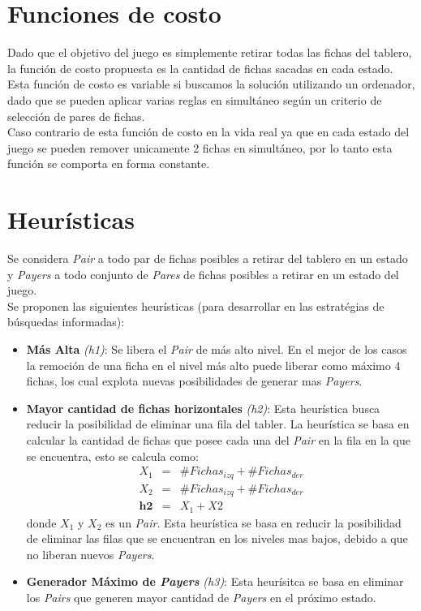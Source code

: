 \documentclass{sig-alternate}
\begin{document}
\section*{Funciones de costo}

	Dado que el objetivo del juego es simplemente retirar todas las fichas del tablero, la funci\'on de costo propuesta es la cantidad de fichas sacadas en cada estado. \\
	Esta funci\'on de costo es variable si buscamos la soluci\'on utilizando un ordenador, dado que se pueden aplicar varias reglas en simult\'aneo seg\'un un criterio de selecci\'on de pares de fichas. \\
	Caso contrario de esta funci\'on de costo en la vida real ya que en cada estado del juego se pueden remover unicamente 2 fichas en simult\'aneo, por lo tanto esta funci\'on se comporta en forma constante.

\section*{Heur\'isticas}

	Se considera \textit{Pair} a todo par de fichas posibles a retirar del tablero en un estado y \textit{Payers} a todo conjunto de \textit{Pares} de fichas posibles a retirar en un estado del juego. \\
	Se proponen las siguientes heur\'isticas (para desarrollar en las estrat\'egias de b\'usquedas informadas):
	\begin{itemize}

		\item \textbf{M\'as Alta} \textit{(h1)}: Se libera el \textit{Pair} de m\'as alto nivel. En el mejor de los casos la remoci\'on de una ficha en el nivel m\'as alto puede liberar como m\'aximo 4 fichas, los cual explota nuevas posibilidades de generar mas \textit{Payers}.
		
		\item \textbf{Mayor cantidad de fichas horizontales} \textit{(h2)}: Esta heur\'istica busca reducir la posibilidad de eliminar una fila del tabler. La heur\'istica se basa en calcular la cantidad de fichas que posee cada una del \textit{Pair} en la fila en la que se encuentra, esto se calcula como:
			\begin{eqnarray}
				X_{1}  & = & \# Fichas_{izq}+ \# Fichas_{der} \\
				X_{2}  & = & \# Fichas_{izq}+ \# Fichas_{der} \\
				\textbf{h2} & = & X_{1} + X{2}
			\end{eqnarray}
		donde $X_{1}$ y $X_{2}$ es un \textit{Pair}. Esta heur\'istica se basa en reducir la posibilidad de eliminar las filas que se encuentran en los niveles mas bajos, debido a que no liberan nuevos \textit{Payers}.
		
		\item \textbf{Generador M\'aximo de \textit{Payers}} \textit{(h3)}: Esta heur\'isitca se basa en eliminar los \textit{Pairs} que generen mayor cantidad de \textit{Payers} en el pr\'oximo estado.
		
	\end{itemize}
\end{document}
